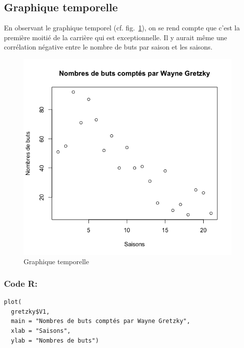 \documentclass[10pt,twocolumn]{article}
\begin{document}
\subsection{Graphique temporelle}
En observant le graphique temporel (cf. fig.~\ref{gretzkyPlot}), on se rend compte que c’est la première moitié de la carrière qui est exceptionnelle. Il y aurait même une corrélation négative entre le nombre de buts par saison et les saisons.

\begin{figure}[htbp]
	\caption{Graphique temporelle}
	\label{gretzkyPlot}
	\centering
	\includegraphics[width=\linewidth]{d1_gretzkyPlot}
\end{figure}

\subsubsection*{Code R:}
\begin{verbatim}
plot(
  gretzky$V1,
  main = "Nombres de buts comptés par Wayne Gretzky",
  xlab = "Saisons",
  ylab = "Nombres de buts")
\end{verbatim}





\end{document}
